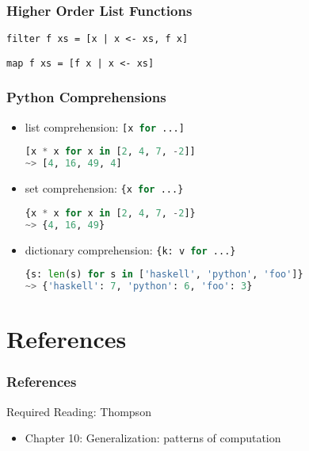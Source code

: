\documentclass[dvipsnames]{beamer}
\theoremstyle{plain}
\begin{document}
\begin{frame}[fragile]
  \frametitle{Higher Order List Functions}

  \begin{lstlisting}[deletekeywords={filter}]
filter f xs = [x | x <- xs, f x]
  \end{lstlisting}

  \begin{lstlisting}[deletekeywords={map}]
map f xs = [f x | x <- xs]
  \end{lstlisting}
\end{frame}

\begin{frame}[fragile]
  \frametitle{Python Comprehensions}

  \begin{itemize}
    \item list comprehension: \lstinline[language=Python]|[x for ...]|
    \begin{lstlisting}[language=Python]
[x * x for x in [2, 4, 7, -2]]
~> [4, 16, 49, 4]
    \end{lstlisting}

    \medskip
    \item set comprehension: \lstinline[language=Python]|{x for ...}|
    \begin{lstlisting}[language=Python]
{x * x for x in [2, 4, 7, -2]}
~> {4, 16, 49}
    \end{lstlisting}

    \medskip
    \item dictionary comprehension: \lstinline[language=Python]|{k: v for ...}|
    \begin{lstlisting}[language=Python]
{s: len(s) for s in ['haskell', 'python', 'foo']}
~> {'haskell': 7, 'python': 6, 'foo': 3}
    \end{lstlisting}
  \end{itemize}
\end{frame}

\section*{References}

\begin{frame}
  \frametitle{References}

  \begin{block}{Required Reading: Thompson}
    \begin{itemize}
      \item Chapter 10: \alert{Generalization: patterns of computation}
    \end{itemize}
  \end{block}
\end{frame}
\end{document}
